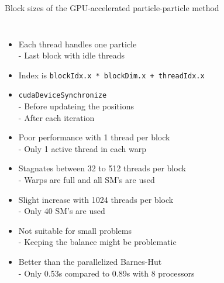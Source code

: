 \documentclass[8pt]{beamer}
\begin{document}
\begin{frame}{Block sizes of the GPU-accelerated particle-particle method}

    \begin{columns}
         {
            \centering
            \begin{itemize}
                \item Each thread handles one particle
                    \\ - {\small Last block with idle threads}
                \item Index is {\small \texttt{blockIdx.x * blockDim.x + threadIdx.x}}
                \item \texttt{cudaDeviceSynchronize}
                    \\ - {\small Before updateing the positions}
                    \\ - {\small After each iteration}
                \item Poor performance with 1 thread per block
                    \\ - {\small Only 1 active thread in each warp}
                \item Stagnates between 32 to 512 threads per block
                    \\ - {\small Warps are full and all SM's are used}
                \item Slight increase with 1024 threads per block
                    \\ - {\small Only 40 SM's are used}
                \item Not suitable for small problems
                    \\ - {\small Keeping the balance might be problematic}
                \item Better than the parallelized Barnes-Hut
                    \\ - {\small Only 0.53s compared to 0.89s with 8 processors}
            \end{itemize}
        }
         {
            \centering
            \begin{figure}
                \centering

\end{figure}}
\end{columns}
\end{frame}
\end{document}
